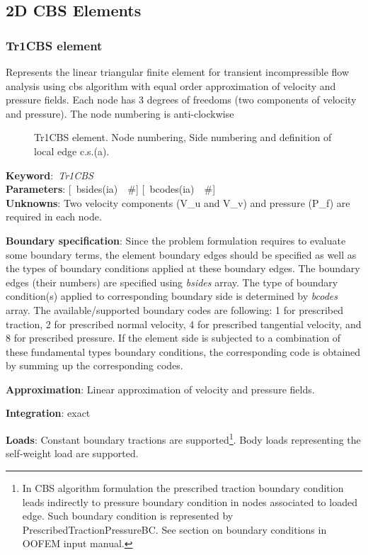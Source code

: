 \documentclass[12pt,dvips]{article}
\newcommand{\descitem}[1]{{\noindent \bf #1}:}
\newcommand{\elemkeyword}[1]{\descitem{Keyword}~{\em #1}}
\newcommand{\elemparam}[2]{{{#1\tiny (#2)}~~\#}}
\newcommand{\optelemparam}[2]{{[~\elemparam{#1}{#2}]}}
\newcommand{\param}[1]{{\it #1}}
\begin{document}
\subsection{2D CBS Elements}
\subsubsection{Tr1CBS element}
\label{Tr1CBS}
Represents the linear triangular finite element for transient
incompressible flow analysis using cbs algorithm with equal order
approximation of velocity and pressure fields. Each node has 3 degrees
of freedoms (two components of velocity and pressure).
The node numbering is anti-clockwise

\begin{figure}[tb]
\begin{center}\end{center}
\caption{Tr1CBS element. Node numbering, Side numbering and
definition of local edge c.s.(a).}
\label{Tr1CBSfig}
\end{figure}

\elemkeyword{Tr1CBS}\\
\descitem{Parameters} \optelemparam{bsides}{ia} \optelemparam{bcodes}{ia}\\
\descitem{Unknowns}
Two velocity components (V\_u and V\_v) and pressure (P\_f) are required in each node.

\descitem{Boundary specification}
Since the problem formulation requires to evaluate some boundary terms,
the element boundary edges should be specified as well as the types of
boundary conditions applied at these boundary edges. The boundary
edges (their numbers) are specified using \param{bsides} array. The
type of boundary condition(s) applied to corresponding boundary side
is determined by \param{bcodes} array. The available/supported
boundary codes are following: 1 for prescribed traction, 2 for
prescribed normal velocity, 4 for prescribed tangential velocity, and
8 for prescribed pressure. If the element side is subjected to a
combination of these fundamental types boundary conditions, the
corresponding code is obtained by summing up the corresponding codes.

\descitem{Approximation} Linear approximation of velocity and pressure
fields.

\descitem{Integration}
exact

\descitem{Loads} Constant boundary tractions are supported\footnote{In CBS algorithm formulation the prescribed traction
boundary condition leads indirectly to pressure boundary condition in
nodes associated to loaded edge. Such boundary condition is
represented by PrescribedTractionPressureBC. See section on boundary
conditions in OOFEM input manual.}. Body loads
representing the self-weight load are supported.
\end{document}
